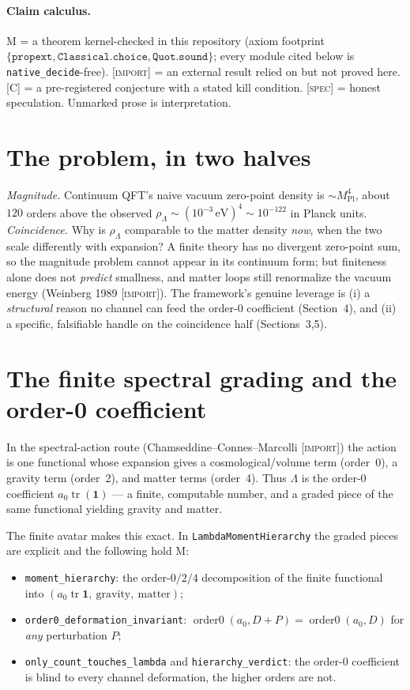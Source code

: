 \documentclass[11pt]{article}
\newcommand{\Lam}{\Lambda}
\newcommand{\Kernel}{\textcolor{kcol}{\textsc{M}}}       %
\newcommand{\Import}{\textcolor{icol}{\textsc{[import]}}} %
\newcommand{\Conj}{\textcolor{ccol}{\textsc{[C]}}}        %
\newcommand{\Spec}{\textcolor{scol}{\textsc{[spec]}}}     %
\newcommand{\lm}[1]{\texttt{#1}}
\begin{document}
\paragraph{Claim calculus.}  \Kernel{} = a theorem kernel-checked in this
repository (axiom footprint $\{\texttt{propext},\texttt{Classical.choice},
\texttt{Quot.sound}\}$; every module cited below is \texttt{native\_decide}-free).
\Import{} = an external result relied on but not proved here.  \Conj{} = a
pre-registered conjecture with a stated kill condition.  \Spec{} = honest
speculation.  Unmarked prose is interpretation.

\section{The problem, in two halves}

\emph{Magnitude.}  Continuum QFT's naive vacuum zero-point density is
$\sim M_{\mathrm{Pl}}^4$, about $120$ orders above the observed
$\rho_\Lam\sim(10^{-3}\,\mathrm{eV})^4\sim10^{-122}$ in Planck units.
\emph{Coincidence.}  Why is $\rho_\Lam$ comparable to the matter density
\emph{now}, when the two scale differently with expansion?  A finite theory has
no divergent zero-point sum, so the magnitude problem cannot appear in its
continuum form; but finiteness alone does not \emph{predict} smallness, and
matter loops still renormalize the vacuum energy (Weinberg 1989 \Import).  The
framework's genuine leverage is (i) a \emph{structural} reason no channel can
feed the order-0 coefficient (Section~4), and (ii) a specific, falsifiable
handle on the coincidence half (Sections~3,5).

\section{The finite spectral grading and the order-0 coefficient}

In the spectral-action route (Chamseddine--Connes--Marcolli \Import) the action
is one functional whose expansion gives a cosmological/volume term (order~0), a
gravity term (order~2), and matter terms (order~4).  Thus $\Lam$ is the
order-0 coefficient $a_0\operatorname{tr}(\mathbf 1)$ --- a finite, computable
number, and a graded piece of the same functional yielding gravity and matter.

The finite avatar makes this exact.  In \lm{LambdaMomentHierarchy} the graded
pieces are explicit and the following hold \Kernel:
\begin{itemize}[leftmargin=1.6em,itemsep=1pt]
\item \lm{moment\_hierarchy}: the order-$0/2/4$ decomposition of the finite
  functional into $(a_0\operatorname{tr}\mathbf1,\ \text{gravity},\ \text{matter})$;
\item \lm{order0\_deformation\_invariant}: $\operatorname{order0}(a_0,D+P)=
  \operatorname{order0}(a_0,D)$ for \emph{any} perturbation $P$;
\item \lm{only\_count\_touches\_lambda} and \lm{hierarchy\_verdict}: the order-0
  coefficient is blind to every channel deformation, the higher orders are not.
\end{itemize}
\end{document}
